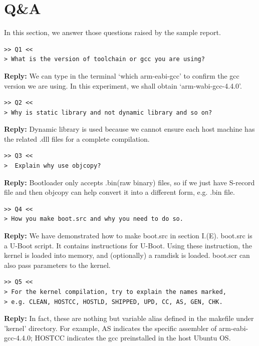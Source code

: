 \documentclass[12pt,journal,draftclsnofoot,onecolumn]{IEEEtran}
\begin{document}
\section{Q\&A}\label{QA}
In this section, we answer those questions raised by the sample report.

\begin{verbatim}
>> Q1 <<
> What is the version of toolchain or gcc you are using?
\end{verbatim}
\textbf{Reply:} We can type in the terminal `which arm-eabi-gcc' to confirm the gcc version we are 
using. In this experiment, we shall obtain `arm-wabi-gcc-4.4.0'.

\begin{verbatim}
>> Q2 <<
> Why is static library and not dynamic library and so on?
\end{verbatim}
\textbf{Reply:} Dynamic library is used because we cannot ensure each host machine has 
the related .dll files for a complete compilation. 

\begin{verbatim}
>> Q3 <<
>  Explain why use objcopy?
\end{verbatim}
\textbf{Reply:} Bootloader only accepts .bin(raw binary) files, so if we just have S-record file and then 
objcopy can help convert it into a different form, e.g. .bin file.

\begin{verbatim}
>> Q4 <<
> How you make boot.src and why you need to do so.
\end{verbatim}
\textbf{Reply:} We have demonstrated how to make boot.src in section I.(E). 
boot.src is a U-Boot script. It contains instructions for U-Boot. Using these instruction, the kernel is loaded into memory, and (optionally) a ramdisk is loaded. boot.scr can also pass parameters to the kernel.

\begin{verbatim}
>> Q5 <<
> For the kernel compilation, try to explain the names marked, 
> e.g. CLEAN, HOSTCC, HOSTLD, SHIPPED, UPD, CC, AS, GEN, CHK.
\end{verbatim}
\textbf{Reply:} In fact, these are nothing but variable alias defined in the makefile under 'kernel' directory.
For example, AS indicates the specific assembler of arm-eabi-gcc-4.4.0; HOSTCC indicates the gcc preinstalled
in the host Ubuntu OS. 


%
%
\clearpage
\end{document}
